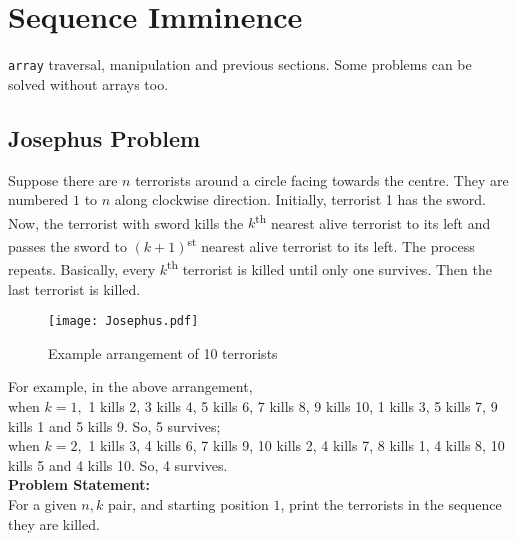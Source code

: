 \section{Sequence Imminence}{\label{sec:sequences}}
\begin{topics}
\verb!array! traversal, manipulation and previous sections. Some problems can be solved without arrays too.
\end{topics}
\subsection{Josephus Problem}
Suppose there are $n$ terrorists around a circle facing towards the centre. They are numbered $1$ to $n$ along clockwise direction. Initially, terrorist 1 has the sword. Now, the terrorist with sword kills the $k$\textsuperscript{th} nearest alive terrorist to its left and passes the sword to $(k+1)$\textsuperscript{st} nearest alive terrorist to its left. The process repeats. Basically, every $k$\textsuperscript{th} terrorist is killed until only one survives. Then the last terrorist is killed.
\begin{figure}[H]
    \centering
    \texttt{[image: Josephus.pdf]}
    \caption{Example arrangement of 10 terrorists}
    \label{fig:jp}
\end{figure}
\vspace{-1.5em}
For example, in the above arrangement,\\
when $k=1,$ 1 kills 2, 3 kills 4, 5 kills 6, 7 kills 8, 9 kills 10, 1 kills 3, 5 kills 7, 9 kills 1 and 5 kills 9. So, 5 survives;\\%
when $k=2,$ 1 kills 3, 4 kills 6, 7 kills 9, 10 kills 2, 4 kills 7, 8 kills 1, 4 kills 8, 10 kills 5 and 4 kills 10. So, 4 survives.\\%
\textbf{Problem Statement:}\\
For a given $n, k$ pair, and starting position $1$, print the terrorists in the sequence they are killed.
